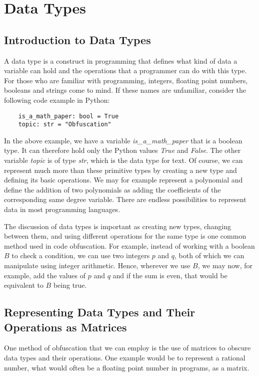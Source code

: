 \section{Data Types}
\subsection{Introduction to Data Types}
A data type is a construct in programming that defines what kind of data a
variable can hold and the operations that a programmer can do with this type.
For those who are familiar with programming, integers, floating point numbers,
booleans and strings come to mind. If these names are unfamiliar, consider the
following code example in Python:
\begin{verbatim}
    is_a_math_paper: bool = True
    topic: str = "Obfuscation"
\end{verbatim}
In the above example, we have a variable \textit{is\_a\_math\_paper} that is a
boolean type. It can therefore hold only the Python values \textit{True} and
\textit{False}. The other variable \textit{topic} is of type \textit{str},
which is the data
type for text. Of course, we can represent much more than
these primitive types by creating a new type and defining its basic
operations. We may for example represent a polynomial and define the addition
of two polynomials as adding the coefficients of the corresponding
same degree variable. There are endless possibilities to represent data in
most programming languages.

The discussion of data types is important as creating new types, changing
between them, and using different operations for the same type is one common
method used in code obfuscation. For example, instead of working with a boolean
$ B $ to check a condition, we can use two integers $ p $ and $ q $, both of
which we can manipulate using integer arithmetic. Hence, wherever we use $ B $,
we may now, for example, add the values of $ p $ and $ q $ and if the sum is
even, that would be equivalent to $ B $ being true.

\subsection{Representing Data Types and Their Operations as Matrices}
One method of obfuscation that we can employ is the use of matrices to obscure
data types and their operations. One example would be to represent a
rational number, what would often be a floating point number in programs, as a
matrix.

